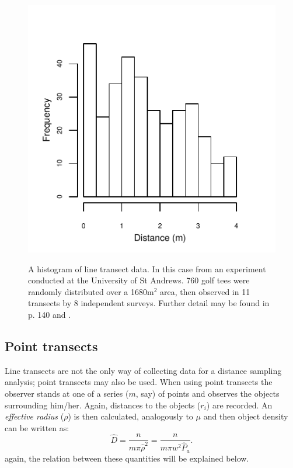\begin{figure}
\centering
\includegraphics{intro/figs/ds-golftee.pdf}\\
\caption{A histogram of line transect data. In this case from an experiment conducted at the University of St Andrews. 760 golf tees were randomly distributed over a 1680m$^2$ area, then observed in 11 transects by 8 independent surveys. Further detail may be found in \cite{ADS} p. 140 and \cite{yellowbook}.}
\label{ds-lt-example}
\end{figure}

\subsection{Point transects}
Line transects are not the only way of collecting data for a distance sampling analysis; point transects may also be used. When using point transects the observer stands at one of a series ($m$, say) of points and observes the objects surrounding him/her. Again, distances to the objects ($r_i$) are recorded. An \textit{effective radius} ($\rho$) is then calculated, analogously to $\mu$ and then object density can be written as:
\begin{equation}
\hat{D}=\frac{n}{m \pi \hat{\rho}^2}=\frac{n}{m\pi w^2\hat{P}_a}.
\end{equation}
again, the relation between these quantities will be explained below.

